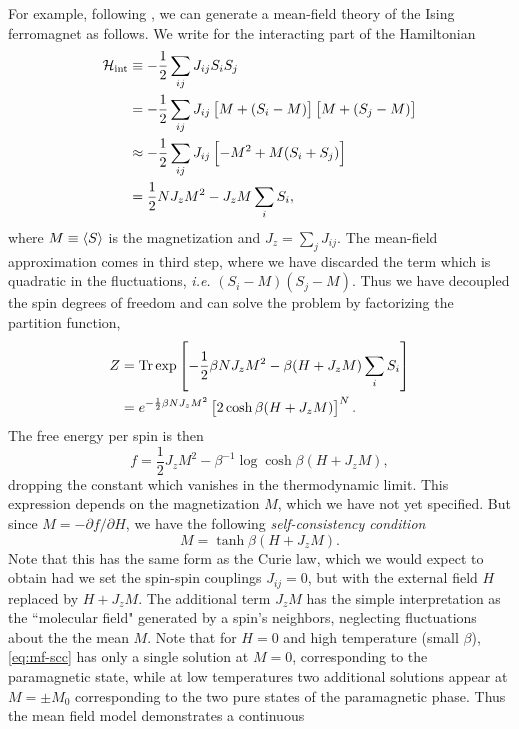For example, following \textcite{cardy1996scaling}, we can generate a mean-field
theory of the Ising ferromagnet as follows. We write for the interacting part
of the Hamiltonian
\begin{align*}
  \mathcal{H}_{\mathrm{int}}
  &\equiv -\frac{1}{2} \sum_{ij} J_{ij} S_i S_j \\
  &= -\frac{1}{2} \sum_{ij} J_{ij} \left[M + (S_i - M)\right]\left[M + (S_j - M)\right] \\
  &\approx -\frac{1}{2} \sum_{ij} J_{ij} \left[-M^2 + M(S_i + S_j)\right] \\
  &= \frac{1}{2} N J_z M^2 - J_z M \sum_i S_i,
\end{align*}
where $M \equiv \left< S \right>$ is the magnetization and $J_z=\sum_j J_{ij}$. The
mean-field approximation comes in third step, where we have discarded the term
which is quadratic in the fluctuations, \textit{i.e.} $(S_i - M)(S_j - M)$.
Thus we have decoupled the spin degrees of freedom and can solve the problem by
factorizing the partition function,
\begin{align*}
  Z
  &= \operatorname{Tr}\exp\left[-\frac{1}{2} \beta N J_z M^2 - \beta(H + J_z M) \sum_i S_i\right] \\
  &= e^{-\frac{1}{2} \beta N J_z M^2} \left[2 \cosh \beta(H + J_z M)\right]^N.
\end{align*}
The free energy per spin is then
\begin{equation}
  f = \frac{1}{2} J_z M^2 - \beta^{-1}\log\cosh\beta(H + J_z M),
  \label{eq:mf-fe}
\end{equation}
dropping the constant which vanishes in the thermodynamic limit. This
expression depends on the magnetization $M$, which we have not yet specified.
But since $M = -\partial f / \partial H$, we have the following
\emph{self-consistency condition}
\begin{equation}
  M = \tanh\beta(H + J_z M).
  \label{eq:mf-scc}
\end{equation}
Note that this has the same form as the Curie law, which we would expect to
obtain had we set the spin-spin couplings $J_{ij}=0$, but with the external field
$H$ replaced by $H + J_z M$. The additional term $J_z M$ has the simple
interpretation as the ``molecular field" generated by a spin's neighbors,
neglecting fluctuations about the the mean $M$. Note that for $H=0$ and high
temperature (small $\beta$), \cref{eq:mf-scc} has only a single solution at
$M=0$, corresponding to the paramagnetic state, while at low temperatures two
additional solutions appear at $M=\pm M_0$ corresponding to the two pure states
of the paramagnetic phase. Thus the mean field model demonstrates a continuous
